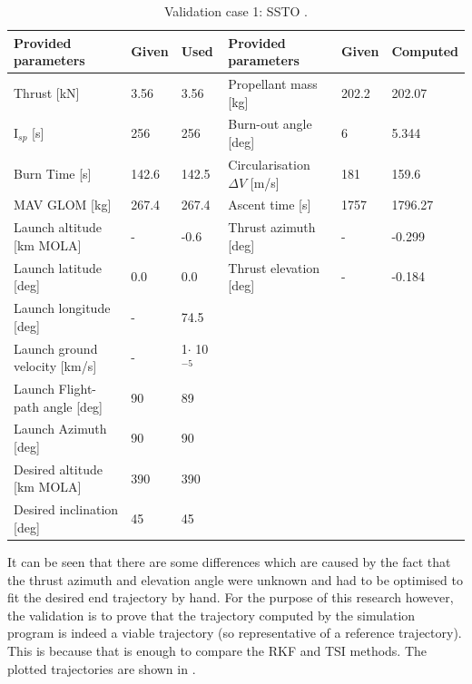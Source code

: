 \begin{table}[H]
\begin{center}
\caption{Validation case 1: \ac{SSTO} \cite{woolley2015simple}.}
\label{tab:validationCaseWoolley}
\begin{tabular}{|l|l|l||l||l|l|}
\hline 
\textbf{Provided parameters} & \textbf{Given} & \textbf{Used} & \textbf{Provided parameters} & \textbf{Given} & \textbf{Computed} \\ \hline \hline
Thrust [kN] & 3.56 & 3.56 & Propellant mass [kg] & 202.2 & 202.07 \\ \hline
I$_{sp}$ [s] & 256 & 256 & Burn-out angle [deg] & 6 & 5.344 \\ \hline
Burn Time [s] & 142.6 & 142.5 & Circularisation $\Delta V$ [m/s] & 181 & 159.6 \\ \hline
\ac{MAV} \ac{GLOM} [kg] & 267.4 & 267.4 & Ascent time [s] & 1757 & 1796.27 \\ \hline
Launch altitude [km \ac{MOLA}] & - & -0.6 & Thrust azimuth [deg] & - & -0.299 \\ \hline
Launch latitude [deg] & 0.0 & 0.0 & Thrust elevation [deg] & - & -0.184 \\ \hline
Launch longitude [deg] & - & 74.5 & & & \\ \hline
Launch ground velocity [km/s] & - & 1$\cdot $ 10$^{-5}$ & & & \\ \hline
Launch Flight-path angle [deg] & 90 & 89 & & & \\ \hline
Launch Azimuth [deg] & 90 & 90 & & & \\ \hline
Desired altitude [km \ac{MOLA}] & 390 & 390 & & & \\ \hline
Desired inclination [deg] & 45 & 45 & & & \\ \hline




\end{tabular}
\end{center}
\end{table}

\noindent
It can be seen that there are some differences which are caused by the fact that the thrust azimuth and elevation angle were unknown and had to be optimised to fit the desired end trajectory by hand. For the purpose of this research however, the validation is to prove that the trajectory computed by the simulation program is indeed a viable trajectory (so representative of a reference trajectory). This is because that is enough to compare the \ac{RKF} and \ac{TSI} methods. The plotted trajectories are shown in .


